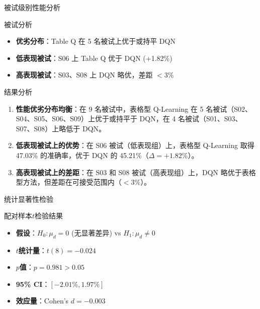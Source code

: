 {\begin{frame}{被试级别性能分析}
    \begin{block}{被试分析}
        \footnotesize
        \begin{itemize}
            \item \textbf{优劣分布}：Table Q 在 5 名被试上优于或持平 DQN
            \item \textbf{低表现被试}：S06 上 Table Q 优于 DQN (+1.82\%)
            \item \textbf{高表现被试}：S03、S08 上 DQN 略优，差距 $< 3\%$
        \end{itemize}
    \end{block}

    \vspace{0.2cm}
    \begin{block}{结果分析}
        \footnotesize
        \begin{enumerate}
            \item \textbf{性能优劣分布均衡}：在 9 名被试中，表格型 Q-Learning 在 5 名被试（S02、S04、S05、S06、S09）上优于或持平于 DQN，在 4 名被试（S01、S03、S07、S08）上略低于 DQN。
            \item \textbf{低表现被试上的优势}：在 S06 被试（低表现组）上，表格型 Q-Learning 取得 47.03\% 的准确率，优于 DQN 的 45.21\%（$\Delta = +1.82\%$）。
            \item \textbf{高表现被试上的差距}：在 S03 和 S08 被试（高表现组）上，DQN 略优于表格型方法，但差距在可接受范围内（$< 3\%$）。
        \end{enumerate}
    \end{block}
\end{frame}

\begin{frame}{统计显著性检验}
    \begin{block}{配对样本$t$检验结果}
        \footnotesize
        \begin{itemize}
            \item \textbf{假设}：$H_0: \mu_d = 0$ (无显著差异) vs $H_1: \mu_d \neq 0$
            \item \textbf{$t$统计量}：$t(8) = -0.024$
            \item \textbf{$p$值}：$p = 0.981 > 0.05$
            \item \textbf{95\% CI}：$[-2.01\%, 1.97\%]$
            \item \textbf{效应量}：Cohen's $d = -0.003$
        \end{itemize}
    \end{block}


\end{frame}}

